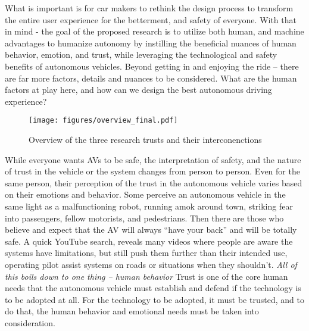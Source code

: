 What is important is for car makers to rethink the design process to transform the entire user experience for the betterment, and safety of everyone. 
With that in mind - the goal of the proposed research is to utilize both human, and machine advantages to humanize autonomy by instilling the beneficial nuances of human behavior, emotion, and trust, while leveraging the technological and safety benefits of autonomous vehicles.
Beyond getting in and enjoying the ride – there are far more factors, details and nuances to be considered. 
What are the human factors at play here, and how can we design the best autonomous driving experience?

\begin{figure}
    \centering
    \texttt{[image: figures/overview\_final.pdf]}
    \caption{Overview of the three research trusts and their interconenctions}
    \label{fig:overview}
\end{figure}



While everyone wants AVs to be safe, the interpretation of safety, and the nature of trust in the vehicle or the system changes from person to person.
Even for the same person, their perception of the trust in the autonomous vehicle varies based on their emotions and behavior.
Some perceive an autonomous vehicle in the same light as a malfunctioning robot, running amok around town, striking fear into passengers, fellow motorists, and pedestrians.
Then there are those who believe and expect that the AV will always ``have your back'' and will be totally safe.
A quick YouTube search, reveals many videos where people are aware the systems have limitations, but still push them further than their intended use, operating pilot assist systems on roads or situations when they shouldn't.
\textit{All of this boils down to one thing – human behavior}
Trust is one of the core human needs that the autonomous vehicle must establish and defend if the technology is to be adopted at all.
For the technology to be adopted, it must be trusted, and to do that, the human behavior and emotional needs must be taken into consideration. 


